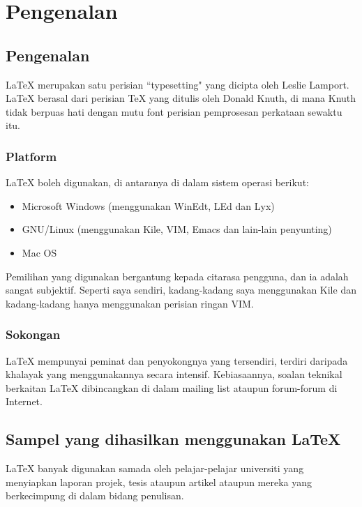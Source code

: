 
\chapter{Pengenalan}
\section{Pengenalan}
\label{pengenalan}

\LaTeX{} merupakan satu perisian ``typesetting" yang dicipta oleh Leslie Lamport. \LaTeX{} berasal dari perisian \TeX{} yang ditulis oleh Donald Knuth, di mana Knuth tidak berpuas hati
dengan mutu font perisian pemprosesan perkataan sewaktu itu.

\subsection{Platform}
\LaTeX{} boleh digunakan, di antaranya di dalam sistem operasi berikut:

\begin{itemize}
\item Microsoft Windows (menggunakan WinEdt, LEd dan Lyx)
\item GNU/Linux (menggunakan Kile, VIM, Emacs dan lain-lain penyunting)
\item Mac OS
\end{itemize}

Pemilihan  yang digunakan bergantung kepada citarasa pengguna, dan ia adalah sangat subjektif. Seperti saya sendiri, kadang-kadang saya menggunakan Kile dan kadang-kadang hanya 
menggunakan perisian ringan VIM. 

\subsection{Sokongan}
\LaTeX{} mempunyai peminat dan penyokongnya yang tersendiri, terdiri daripada khalayak yang menggunakannya secara intensif. Kebiasaannya, soalan teknikal berkaitan \LaTeX{} dibincangkan di dalam
mailing list ataupun forum-forum di Internet. 

\section{Sampel yang dihasilkan menggunakan \LaTeX}
\LaTeX{} banyak digunakan samada oleh pelajar-pelajar universiti yang menyiapkan laporan projek, tesis ataupun artikel ataupun mereka yang berkecimpung di dalam bidang penulisan.


